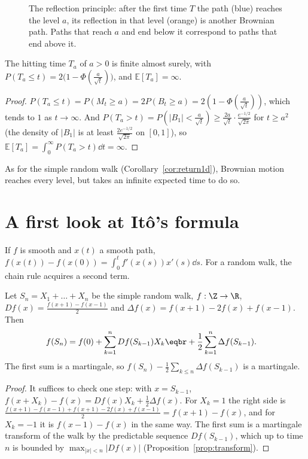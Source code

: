 \begin{figure}[ht]
\centering
{}
\caption{The reflection principle: after the first time $T$ the path (blue) reaches the level $a$, its reflection in that level
(orange) is another Brownian path. Paths that reach $a$ and end below it correspond to paths that end above it.}
\label{fig:bmreflect}
\end{figure}

\begin{corollary}\label{cor:hitting}
The hitting time $T_a$ of $a>0$ is finite almost surely, with $P(T_a\le t)=2\bigl(1-\Phi(\frac a{\sqrt t})\bigr)$, and $\mathbb E[T_a]=\infty$.
\end{corollary}
\begin{proof}
$P(T_a\le t)=P(M_t\ge a)=2P(B_t\ge a)=2(1-\Phi(\frac a{\sqrt t}))$, which tends to $1$ as $t\to\infty$. And $P(T_a>t)=P(|B_1|<\frac a{\sqrt t})\ge\frac{2a}{\sqrt t}\cdot\frac{e^{-1/2}}{\sqrt{2\pi}}$ for $t\ge a^2$
(the density of $|B_1|$ is at least $\frac{2e^{-1/2}}{\sqrt{2\pi}}$ on $[0,1]$), so $\mathbb E[T_a]=\int_0^\infty P(T_a>t)\dd t=\infty$.
\end{proof}

As for the simple random walk (Corollary~\ref{cor:return1d}), Brownian motion reaches every level, but takes an infinite expected time to do so.

\section{A first look at It\^o's formula}

If $f$ is smooth and $x(t)$ a smooth path, $f(x(t))-f(x(0))=\int_0^tf'(x(s))x'(s)\dd s$. For a random walk, the chain rule acquires a second term.

\begin{proposition}\label{prop:discreteito}
Let $S_n=X_1+\dots+X_n$ be the simple random walk, $f:\Z\to\R$, $Df(x)=\frac{f(x+1)-f(x-1)}2$ and $\Delta f(x)=f(x+1)-2f(x)+f(x-1)$. Then
\[
\begin{aligned}f(S_n)&=f(0)+\sum_{k=1}^nDf(S_{k-1})X_k\eqbr+\frac12\sum_{k=1}^n\Delta f(S_{k-1}).\end{aligned}
\]
The first sum is a martingale, so $f(S_n)-\frac12\sum_{k\le n}\Delta f(S_{k-1})$ is a martingale.
\end{proposition}
\begin{proof}
It suffices to check one step: with $x=S_{k-1}$, $f(x+X_k)-f(x)=Df(x)X_k+\frac12\Delta f(x)$. For $X_k=1$ the right side is
$\frac{f(x+1)-f(x-1)+f(x+1)-2f(x)+f(x-1)}2=f(x+1)-f(x)$, and for $X_k=-1$ it is $f(x-1)-f(x)$ in the same way. The first sum is a martingale transform
of the walk by the predictable sequence $Df(S_{k-1})$, which up to time $n$ is bounded by $\max_{|x|<n}|Df(x)|$ (Proposition~\ref{prop:transform}).
\end{proof}

